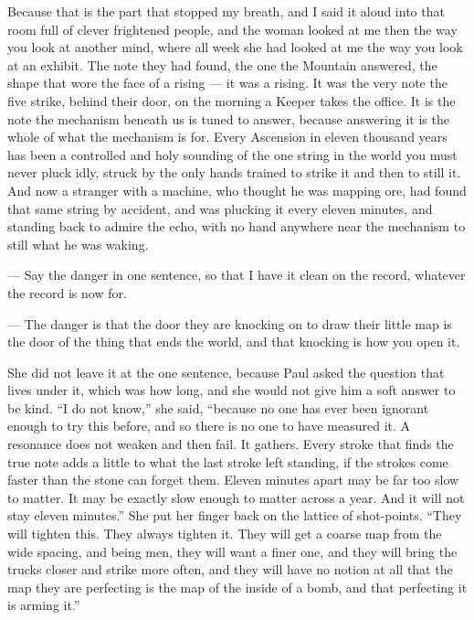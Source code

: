 Because that is the part that stopped my breath, and I said it aloud into that room full of clever frightened people, and the woman looked at me then the way you look at another mind, where all week she had looked at me the way you look at an exhibit. The note they had found, the one the Mountain answered, the shape that wore the face of a rising --- it was a rising. It was the very note the five strike, behind their door, on the morning a Keeper takes the office. It is the note the mechanism beneath us is tuned to answer, because answering it is the whole of what the mechanism is for. Every Ascension in eleven thousand years has been a controlled and holy sounding of the one string in the world you must never pluck idly, struck by the only hands trained to strike it and then to still it. And now a stranger with a machine, who thought he was mapping ore, had found that same string by accident, and was plucking it every eleven minutes, and standing back to admire the echo, with no hand anywhere near the mechanism to still what he was waking.\par

\begin{room}

--- Say the danger in one sentence, so that I have it clean on the record, whatever the record is now for.

--- The danger is that the door they are knocking on to draw their little map is the door of the thing that ends the world, and that knocking is how you open it.

\end{room}

She did not leave it at the one sentence, because Paul asked the question that lives under it, which was how long, and she would not give him a soft answer to be kind. ``I do not know,'' she said, ``because no one has ever been ignorant enough to try this before, and so there is no one to have measured it. A resonance does not weaken and then fail. It gathers. Every stroke that finds the true note adds a little to what the last stroke left standing, if the strokes come faster than the stone can forget them. Eleven minutes apart may be far too slow to matter. It may be exactly slow enough to matter across a year. And it will not stay eleven minutes.'' She put her finger back on the lattice of shot-points. ``They will tighten this. They always tighten it. They will get a coarse map from the wide spacing, and being men, they will want a finer one, and they will bring the trucks closer and strike more often, and they will have no notion at all that the map they are perfecting is the map of the inside of a bomb, and that perfecting it is arming it.''\par

